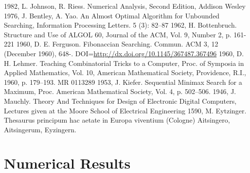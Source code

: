 \documentclass[preprint,1p,times]{elsarticle}
\begin{document}
\begin{thebibliography}{9}
 1982, L. Johnson, R. Riess. Numerical Analysis, Second Edition, Addison Wesley
 1976, J. Bentley, A. Yao. An Almost Optimal Algorithm for Unbounded Searching, Information Processing Letters. 5 (3): 82–87
 1962, H. Bottenbruch. Structure and Use of ALGOL 60, Journal of the ACM, Vol. 9, Number 2, p. 161-221
 1960, D. E. Ferguson. Fibonaccian Searching. Commun. ACM 3, 12 (December 1960), 648-. DOI=\url{http://dx.doi.org/10.1145/367487.367496}
 1960, D. H. Lehmer. Teaching Combinatorial Tricks to a Computer, Proc. of Symposia in Applied Mathematics, Vol. 10, American Mathematical Society, Providence, R.I., 1960, p. 179–193. MR 0113289
 1953, J. Kiefer. Sequential Minimax Search for a Maximum, Proc. American Mathematical Society, Vol. 4, p. 502–506.
 1946, J. Mauchly. Theory And Techniques for Design of Electronic Digital Computers, Lectures given at the Moore School of Electrical Engineering
 1590, M. Eytzinger. Thesaurus principum hac aetate in Europa viventium (Cologne)
Aitsingero, Aitsingerum, Eyzingern.
\end{thebibliography}

%

\pagebreak
\appendix

\section{Numerical Results}


\end{document}
